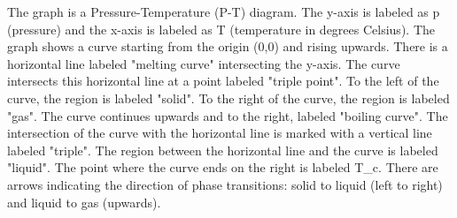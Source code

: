 The graph is a Pressure-Temperature (P-T) diagram. The y-axis is labeled as p (pressure) and the x-axis is labeled as T (temperature in degrees Celsius). The graph shows a curve starting from the origin (0,0) and rising upwards. There is a horizontal line labeled "melting curve" intersecting the y-axis. The curve intersects this horizontal line at a point labeled "triple point". To the left of the curve, the region is labeled "solid". To the right of the curve, the region is labeled "gas". The curve continues upwards and to the right, labeled "boiling curve". The intersection of the curve with the horizontal line is marked with a vertical line labeled "triple". The region between the horizontal line and the curve is labeled "liquid". The point where the curve ends on the right is labeled T_c. There are arrows indicating the direction of phase transitions: solid to liquid (left to right) and liquid to gas (upwards).